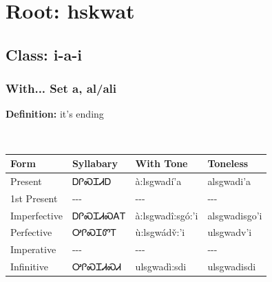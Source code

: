 \needspace{4in}
\section*{Root: hskwat}
\nopagebreak
{}
\needspace{3in}
\subsection*{Class: i-a-i}
\nopagebreak
\subsubsection*{With... Set a, al/ali}
\nopagebreak
\textbf{Definition: } it{\textquoteright}s ending
\\[0.5em]
\begin{tabularx}{\textwidth}{l X X X}%
\toprule%
\textbf{Form}&\textbf{Syllabary}&\textbf{With Tone}&\textbf{Toneless}\\%
\midrule%
Present&ᎠᎵᏍᏆᏗᎠ&à:lsgwadí’a&alsgwadi’a\\%
1st Present&{-}{-}{-}&{-}{-}{-}&{-}{-}{-}\\%
Imperfective&ᎠᎵᏍᏆᏗᏍᎪᎢ&à:lsgwadî:sgó:’i&alsgwadisgo’i\\%
Perfective&ᎤᎵᏍᏆᏛᎢ&ù:lsgwádv̌:’i&ulsgwadv’i\\%
Imperative&{-}{-}{-}&{-}{-}{-}&{-}{-}{-}\\%
Infinitive&ᎤᎵᏍᏆᏗᏍᏗ&ulsgwadì:sdi&ulsgwadisdi\\%
\bottomrule%
\end{tabularx}
\\[1em]